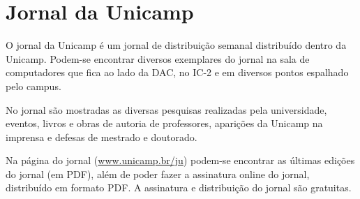 
\section{Jornal da Unicamp}

O jornal da Unicamp é um jornal de distribuição semanal distribuído dentro da
Unicamp. Podem-se encontrar diversos exemplares do jornal na sala de
computadores que fica ao lado da DAC, no IC-2 e em diversos pontos espalhado
pelo campus.

No jornal são mostradas as diversas pesquisas realizadas pela universidade,
eventos, livros e obras de autoria de professores, aparições da Unicamp na
imprensa e defesas de mestrado e doutorado.

Na página do jornal (\url{www.unicamp.br/ju}) podem-se encontrar as últimas
edições do jornal (em PDF), além de poder fazer a assinatura online do jornal,
distribuído em formato PDF. A assinatura e distribuição do jornal são gratuitas.
